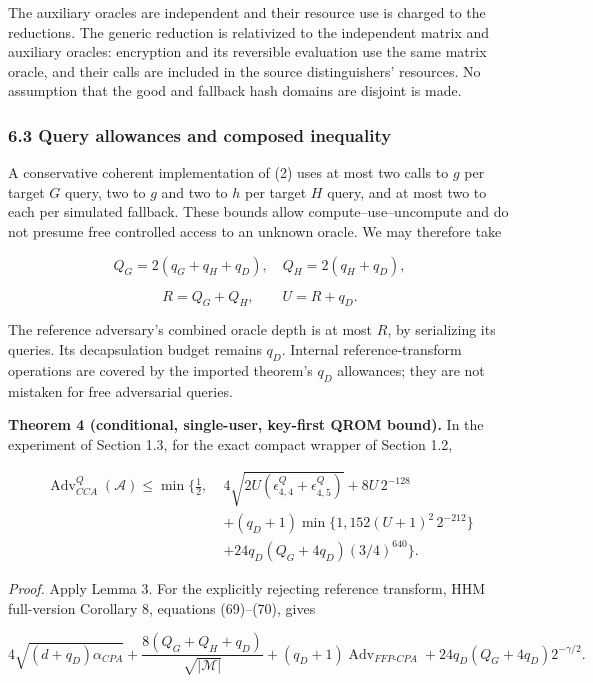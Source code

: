 \documentclass[11pt,a4paper]{article}
\begin{document}
The auxiliary oracles are independent and their resource use is charged to the reductions. The generic reduction is relativized to the independent matrix and auxiliary oracles: encryption and its reversible evaluation use the same matrix oracle, and their calls are included in the source distinguishers' resources. No assumption that the good and fallback hash domains are disjoint is made.

\subsubsection{6.3 Query allowances and composed inequality}\label{query-allowances-and-composed-inequality}

A conservative coherent implementation of (2) uses at most two calls to \(g\) per target \(G\) query, two to \(g\) and two to \(h\) per target \(H\) query, and at most two to each per simulated fallback. These bounds allow compute--use--uncompute and do not presume free controlled access to an unknown oracle. We may therefore take

\[
Q_G=2(q_G+q_H+q_D),\quad Q_H=2(q_H+q_D),
\]

\[
R=Q_G+Q_H,\qquad U=R+q_D.
\tag{3}
\]

The reference adversary's combined oracle depth is at most \(R\), by serializing its queries. Its decapsulation budget remains \(q_D\). Internal reference-transform operations are covered by the imported theorem's \(q_D\) allowances; they are not mistaken for free adversarial queries.

\textbf{Theorem 4 (conditional, single-user, key-first QROM bound).} In the experiment of Section 1.3, for the exact compact wrapper of Section 1.2,

\[
\begin{aligned}
\operatorname{Adv}_{CCA}^{Q}(\mathcal A)\le\min\biggl\{\frac12,\;&
4\sqrt{2U(\epsilon_{4,4}^{Q}+\epsilon_{4,5}^{Q})}
+8U\,2^{-128}\\
&+(q_D+1)\min\{1,152(U+1)^2\,2^{-212}\}\\
&+24q_D(Q_G+4q_D)(3/4)^{640}
\biggr\}.
\end{aligned}
\tag{4}
\]

\emph{Proof.} Apply Lemma 3. For the explicitly rejecting reference transform, HHM full-version Corollary 8, equations (69)--(70), gives

\[
4\sqrt{(d+q_D)\alpha_{CPA}}
+\frac{8(Q_G+Q_H+q_D)}{\sqrt{|\mathcal M|}}
+(q_D+1)\operatorname{Adv}_{FFP\text{-}CPA}
+24q_D(Q_G+4q_D)2^{-\gamma/2}.
\tag{5}
\]
\end{document}
